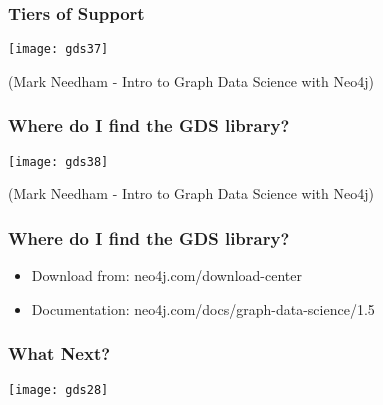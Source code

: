 \begin{frame}[fragile]\frametitle{Tiers of Support}

\begin{center}
\texttt{[image: gds37]}

{\tiny (Mark Needham - Intro to Graph Data Science with Neo4j)}

\end{center}

\end{frame}

\begin{frame}[fragile]\frametitle{Where do I find the GDS library?}

\begin{center}
\texttt{[image: gds38]}

{\tiny (Mark Needham - Intro to Graph Data Science with Neo4j)}

\end{center}

\end{frame}

\begin{frame}[fragile]\frametitle{Where do I find the GDS library?}

\begin{itemize}
\item Download from: neo4j.com/download-center
\item Documentation: neo4j.com/docs/graph-data-science/1.5
\end{itemize}

\end{frame}




\begin{frame}[fragile]\frametitle{What Next?}

\begin{center}
\texttt{[image: gds28]}
\end{center}

\end{frame}
